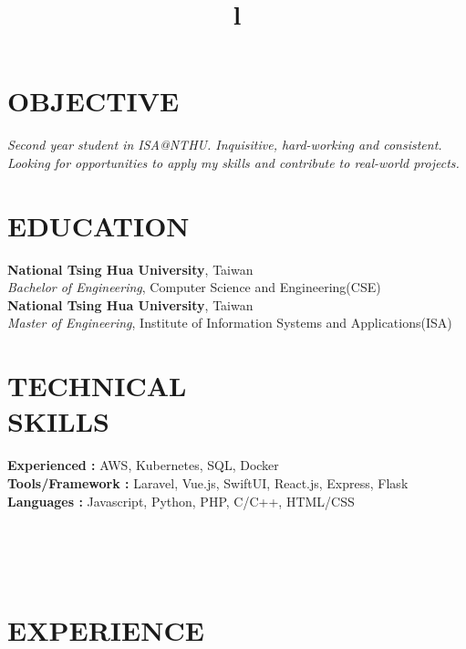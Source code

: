 \documentclass[margin]{res}
\begin{document}
\begin{resume}
\section{OBJECTIVE}
{\sl Second year student in ISA@NTHU. Inquisitive, hard-working and consistent. Looking for opportunities to apply my skills and contribute to real-world projects. }

\section{EDUCATION}
\textbf{National Tsing Hua University}, Taiwan\\
{\sl Bachelor of Engineering}, Computer Science and Engineering(CSE)\\
\textbf{National Tsing Hua University}, Taiwan \\
{\sl Master of Engineering}, Institute of Information Systems and Applications(ISA) 
\section{TECHNICAL\\SKILLS}

\textbf{Experienced : } AWS, Kubernetes, SQL, Docker
\\
\textbf{Tools/Framework : } Laravel, Vue.js, SwiftUI, React.js, Express, Flask
\\
\textbf{Languages : } Javascript, Python, PHP, C/C++, HTML/CSS

\begin{format}
\title{l}\\
\\
\body\\
\end{format}

\section{EXPERIENCE}


\end{resume}
\end{document}
